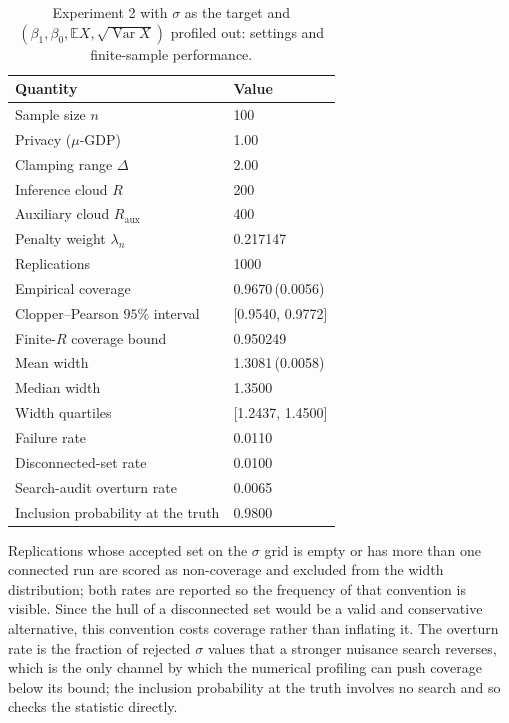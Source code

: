 \begin{table}[!htbp]
\centering
\caption{Experiment 2 with $\sigma$ as the target and $(\beta_1,\beta_0,\mathbb{E}X,\sqrt{\operatorname{Var}X})$ profiled out: settings and finite-sample performance.}
\label{tab:exp2-sigma-summary}
\small
\begin{tabular}{ll}
\toprule
Quantity & Value \\
\midrule
Sample size $n$ & 100 \\
Privacy ($\mu$-GDP) & 1.00 \\
Clamping range $\Delta$ & 2.00 \\
Inference cloud $R$ & 200 \\
Auxiliary cloud $R_{\mathrm{aux}}$ & 400 \\
Penalty weight $\lambda_n$ & 0.217147 \\
Replications & 1000 \\
Empirical coverage & 0.9670\,(0.0056) \\
Clopper--Pearson $95\%$ interval & [0.9540, 0.9772] \\
Finite-$R$ coverage bound & 0.950249 \\
Mean width & 1.3081\,(0.0058) \\
Median width & 1.3500 \\
Width quartiles & [1.2437, 1.4500] \\
Failure rate & 0.0110 \\
Disconnected-set rate & 0.0100 \\
Search-audit overturn rate & 0.0065 \\
Inclusion probability at the truth & 0.9800 \\
\bottomrule
\end{tabular}

\vspace{2pt}
\begin{minipage}{.94\linewidth}\footnotesize
Replications whose accepted set on the $\sigma$ grid is empty or has more than one connected run are scored as non-coverage and excluded from the width distribution; both rates are reported so the frequency of that convention is visible. Since the hull of a disconnected set would be a valid and conservative alternative, this convention costs coverage rather than inflating it. The overturn rate is the fraction of rejected $\sigma$ values that a stronger nuisance search reverses, which is the only channel by which the numerical profiling can push coverage below its bound; the inclusion probability at the truth involves no search and so checks the statistic directly.
\end{minipage}
\end{table}
